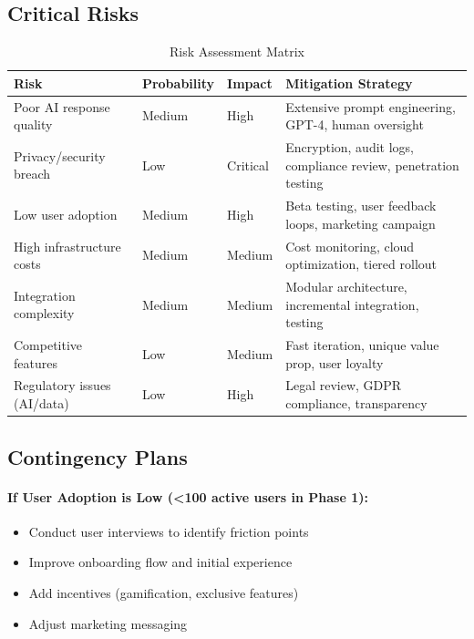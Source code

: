 \documentclass[12pt,a4paper]{article}
\begin{document}
\subsection{Critical Risks}

\begin{table}[h]
\centering
\begin{tabularx}{\textwidth}{|l|l|X|X|}
\hline
\textbf{Risk} & \textbf{Probability} & \textbf{Impact} & \textbf{Mitigation Strategy} \\
\hline
Poor AI response quality & Medium & High & Extensive prompt engineering, GPT-4, human oversight \\
\hline
Privacy/security breach & Low & Critical & Encryption, audit logs, compliance review, penetration testing \\
\hline
Low user adoption & Medium & High & Beta testing, user feedback loops, marketing campaign \\
\hline
High infrastructure costs & Medium & Medium & Cost monitoring, cloud optimization, tiered rollout \\
\hline
Integration complexity & Medium & Medium & Modular architecture, incremental integration, testing \\
\hline
Competitive features & Low & Medium & Fast iteration, unique value prop, user loyalty \\
\hline
Regulatory issues (AI/data) & Low & High & Legal review, GDPR compliance, transparency \\
\hline
\end{tabularx}
\caption{Risk Assessment Matrix}
\end{table}

\subsection{Contingency Plans}

\paragraph{If User Adoption is Low (<100 active users in Phase 1):}
\begin{itemize}
    \item Conduct user interviews to identify friction points
    \item Improve onboarding flow and initial experience
    \item Add incentives (gamification, exclusive features)
    \item Adjust marketing messaging
\end{itemize}
\end{document}
